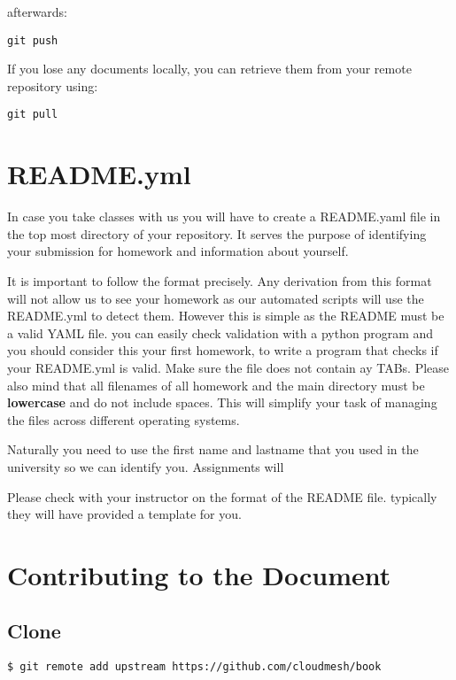 afterwards:

\begin{verbatim}
git push
\end{verbatim}

If you lose any documents locally, you can retrieve them from your
remote repository using:

\begin{verbatim}
git pull
\end{verbatim}

\section{README.yml}

In case you take classes with us you will have to create a README.yaml
file in the top most directory of your repository. It serves the
purpose of identifying your submission for homework and information
about yourself.

It is important to follow the format precisely. Any derivation from
this format will not allow us to see your homework as our automated
scripts will use the README.yml to detect them. However this is simple
as the README must be a valid YAML file. you can easily check
validation with a python program and you should consider this your
first homework, to write a program that checks if your README.yml is
valid. Make sure the file does not contain ay TABs.  Please also mind
that all filenames of all homework and the main directory must be
\textbf{lowercase} and do not include spaces. This will simplify your
task of managing the files across different operating systems.

Naturally you need to use the first name and lastname that you used
in the university so we can identify you. Assignments will 

Please check with your instructor on the format of the README
file. typically they will have provided a template for you.



\section{Contributing to the Document}



\subsection{Clone}

\begin{verbatim}
$ git remote add upstream https://github.com/cloudmesh/book
\end{verbatim}


